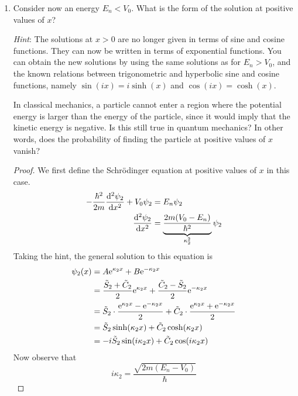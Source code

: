 \documentclass[../psets.tex]{subfiles}
\begin{document}
\begin{enumerate}
\begin{enumerate}
\begin{proof}
            Together, these two equations can (theoretically) be solved for the two variables $k_1,k_2$ and, thus, for the energy states $E_n$.
        \end{proof}
        \item Consider now an energy $E_n<V_0$. What is the form of the solution at positive values of $x$?\par
        \emph{Hint}: The solutions at $x>0$ are no longer given in terms of sine and cosine functions. They can now be written in terms of exponential functions. You can obtain the new solutions by using the same solutions as for $E_n>V_0$, and the known relations between trigonometric and hyperbolic sine and cosine functions, namely $\sin(ix)=i\sinh(x)$ and $\cos(ix)=\cosh(x)$.\par
        In classical mechanics, a particle cannot enter a region where the potential energy is larger than the energy of the particle, since it would imply that the kinetic energy is negative. Is this still true in quantum mechanics? In other words, does the probability of finding the particle at positive values of $x$ vanish?
        \begin{proof}
            We first define the Schr\"{o}dinger equation at positive values of $x$ in this case.
            \begin{align*}
                -\frac{\hbar^2}{2m}\dv[2]{\psi_2}{x}+V_0\psi_2 &= E_n\psi_2\\
                \dv[2]{\psi_2}{x} &= \underbrace{\frac{2m(V_0-E_n)}{\hbar^2}}_{\kappa_2^2}\psi_2
            \end{align*}
            Taking the hint, the general solution to this equation is
            \begin{align*}
                \psi_2(x) &= A\e[\kappa_2x]+B\e[-\kappa_2x]\\
                &= \frac{\tilde{S}_2+\tilde{C}_2}{2}\e[\kappa_2x]+\frac{\tilde{C}_2-\tilde{S}_2}{2}\e[-\kappa_2x]\\
                &= \tilde{S}_2\cdot\frac{\e[\kappa_2x]-\e[-\kappa_2x]}{2}+\tilde{C}_2\cdot\frac{\e[\kappa_2x]+\e[-\kappa_2x]}{2}\\
                &= \tilde{S}_2\sinh(\kappa_2x)+\tilde{C}_2\cosh(\kappa_2x)\\
                &= -i\tilde{S}_2\sin(i\kappa_2x)+\tilde{C}_2\cos(i\kappa_2x)
            \end{align*}
            Now observe that
            \begin{equation*}
                i\kappa_2 = \frac{\sqrt{2m(E_n-V_0)}}{\hbar}

\end{equation*}
\end{proof}
\end{enumerate}
\end{enumerate}
\end{document}
